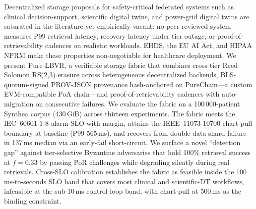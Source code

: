 Decentralized storage proposals for safety-critical federated systems such as clinical decision-support, scientific digital twins, and power-grid digital twins are saturated in the literature yet empirically vacant: no peer-reviewed system measures P99 retrieval latency, recovery latency under tier outage, or proof-of-retrievability cadences on realistic workloads. EHDS, the EU AI Act, and HIPAA NPRM make these properties non-negotiable for healthcare deployment. We present Pure-LBVR, a verifiable storage fabric that combines cross-tier Reed--Solomon RS(2,3) erasure across heterogeneous decentralized backends, BLS-quorum-signed PROV-JSON provenance hash-anchored on PureChain---a custom EVM-compatible PoA chain---and proof-of-retrievability cadences with auto-migration on consecutive failures. We evaluate the fabric on a 100\,000-patient Synthea corpus (430\,GiB) across thirteen experiments. The fabric meets the IEC~60601-1-8 alarm SLO with margin, attains the IEEE~11073-10700 chart-pull boundary at baseline (P99 565\,ms), and recovers from double-data-shard failure in 137\,ms median via an early-fail short-circuit. We surface a novel ``detection gap'' against tier-selective Byzantine adversaries that hold 100\% retrieval success at $f=0.33$ by passing PoR challenges while degrading silently during real retrievals. Cross-SLO calibration establishes the fabric as feasible inside the 100\,ms-to-seconds SLO band that covers most clinical and scientific-DT workflows, infeasible at the sub-10\,ms control-loop band, with chart-pull at 500\,ms as the binding constraint.

